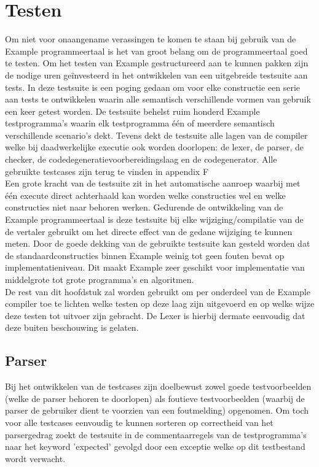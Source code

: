 \chapter{Testen}
Om niet voor onaangename verassingen te komen te staan bij gebruik van de Example programmeertaal is het van groot belang om de programmeertaal goed te testen. Om het testen van Example gestructureerd aan te kunnen pakken zijn de nodige uren ge\"{i}nvesteerd in het ontwikkelen van een uitgebreide testsuite aan tests. In deze testsuite is een poging gedaan om voor elke constructie een serie aan tests te ontwikkelen waarin alle semantisch verschillende vormen van gebruik een keer getest worden. De testsuite behelst ruim honderd Example testprogramma's waarin elk testprogramma \'{e}\'{e}n of meerdere semantisch verschillende scenario's dekt. Tevens dekt de testsuite alle lagen van de compiler welke bij daadwerkelijke executie ook worden doorlopen: de lexer, de parser, de checker, de codedegeneratievoorbereidingslaag en de codegenerator. Alle gebruikte testcases zijn terug te vinden in appendix F\\

Een grote kracht van de testsuite zit in het automatische aanroep waarbij met \'{e}\'{e}n execute direct achterhaald kan worden welke constructies wel en welke constructies niet naar behoren werken. Gedurende de ontwikkeling van de Example programmeertaal is deze testsuite bij elke wijziging/compilatie van de de vertaler gebruikt om het directe effect van de gedane wijziging te kunnen meten. Door de goede dekking van de gebruikte testsuite kan gesteld worden dat de standaardconstructies binnen Example weinig tot geen fouten bevat op implementatieniveau. Dit maakt Example zeer geschikt voor implementatie van middelgrote tot grote programma's en algoritmen.\\

De rest van dit hoofdstuk zal worden gebruikt om per onderdeel van de Example compiler toe te lichten welke testen op deze laag zijn uitgevoerd en op welke wijze deze testen tot uitvoer zijn gebracht. De Lexer is hierbij dermate eenvoudig dat deze buiten beschouwing is gelaten.
 
\section{Parser}
Bij het ontwikkelen van de testcases zijn doelbewust zowel goede testvoorbeelden (welke de parser behoren te doorlopen) als foutieve testvoorbeelden (waarbij de parser de gebruiker dient te voorzien van een foutmelding) opgenomen. Om toch voor alle testcases eenvoudig te kunnen sorteren op correctheid van het parsergedrag zoekt de testsuite in de commentaarregels van de testprogramma's naar het keyword 'expected' gevolgd door een exceptie welke op dit testbestand wordt verwacht.\\

